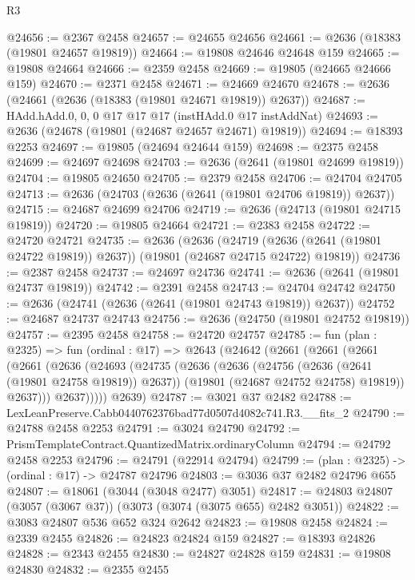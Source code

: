 \begin{lexlean}{R3}
\begin{coremodule}
@24656 := @2367 @2458
@24657 := @24655 @24656
@24661 := @2636 (@18383 (@19801 @24657 @19819))
@24664 := @19808 @24646 @24648 @159
@24665 := @19808 @24664
@24666 := @2359 @2458
@24669 := @19805 (@24665 @24666 @159)
@24670 := @2371 @2458
@24671 := @24669 @24670
@24678 := @2636 (@24661 (@2636 (@18383 (@19801 @24671 @19819)) @2637))
@24687 := HAdd.hAdd.{0, 0, 0} @17 @17 @17 (instHAdd.{0} @17 instAddNat)
@24693 := @2636 (@24678 (@19801 (@24687 @24657 @24671) @19819))
@24694 := @18393 @2253
@24697 := @19805 (@24694 @24644 @159)
@24698 := @2375 @2458
@24699 := @24697 @24698
@24703 := @2636 (@2641 (@19801 @24699 @19819))
@24704 := @19805 @24650
@24705 := @2379 @2458
@24706 := @24704 @24705
@24713 := @2636 (@24703 (@2636 (@2641 (@19801 @24706 @19819)) @2637))
@24715 := @24687 @24699 @24706
@24719 := @2636 (@24713 (@19801 @24715 @19819))
@24720 := @19805 @24664
@24721 := @2383 @2458
@24722 := @24720 @24721
@24735 := @2636
    (@2636
      (@24719 (@2636 (@2641 (@19801 @24722 @19819)) @2637))
      (@19801 (@24687 @24715 @24722) @19819))
@24736 := @2387 @2458
@24737 := @24697 @24736
@24741 := @2636 (@2641 (@19801 @24737 @19819))
@24742 := @2391 @2458
@24743 := @24704 @24742
@24750 := @2636 (@24741 (@2636 (@2641 (@19801 @24743 @19819)) @2637))
@24752 := @24687 @24737 @24743
@24756 := @2636 (@24750 (@19801 @24752 @19819))
@24757 := @2395 @2458
@24758 := @24720 @24757
@24785 := fun (plan : @2325) =>
  fun (ordinal : @17) =>
  @2643
    (@24642
      (@2661
        (@2661
          (@2661
            (@2661
              (@2636
                (@24693
                  (@24735
                    (@2636
                      (@2636
                        (@24756 (@2636 (@2641 (@19801 @24758 @19819)) @2637))
                        (@19801 (@24687 @24752 @24758) @19819))
                      @2637)))
                @2637)))))
      @2639)
@24787 := @3021 @37 @2482
@24788 := LexLeanPreserve.Cabb0440762376bad77d0507d4082c741.R3.__fits_2
@24790 := @24788 @2458 @2253
@24791 := @3024 @24790
@24792 := PrismTemplateContract.QuantizedMatrix.ordinaryColumn
@24794 := @24792 @2458 @2253
@24796 := @24791 (@22914 @24794)
@24799 := (plan : @2325) -> (ordinal : @17) -> @24787 @24796
@24803 := @3036 @37 @2482 @24796 @655
@24807 := @18061 (@3044 (@3048 @2477) @3051)
@24817 := @24803 @24807 (@3057 (@3067 @37)) (@3073 (@3074 (@3075 @655) @2482 @3051))
@24822 := @3083 @24807 @536 @652 @324 @2642
@24823 := @19808 @2458
@24824 := @2339 @2455
@24826 := @24823 @24824 @159
@24827 := @18393 @24826
@24828 := @2343 @2455
@24830 := @24827 @24828 @159
@24831 := @19808 @24830
@24832 := @2355 @2455

\end{coremodule}
\end{lexlean}
